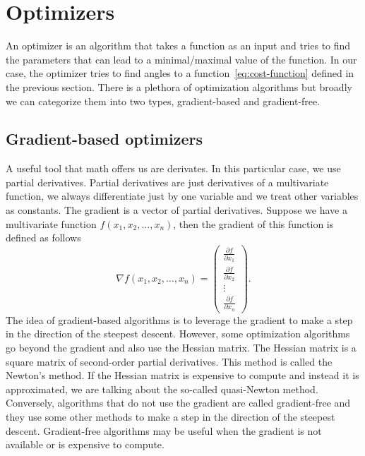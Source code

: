 \section{Optimizers}
An optimizer is an algorithm that takes a function as an input and tries to find the parameters that can lead to a minimal/maximal value of the function. In our case, the optimizer tries to find angles to a function~\ref{eq:cost-function} defined in the previous section. There is a plethora of optimization algorithms but broadly we can categorize them into two types, gradient-based and gradient-free.

\subsection{Gradient-based optimizers}
A useful tool that math offers us are derivates. In this particular case, we use partial derivatives. Partial derivatives are just derivatives of a multivariate  function, we always differentiate just by one variable and we treat other variables as constants. The gradient is a vector of partial derivatives. Suppose we have a multivariate function $f(x_1, x_2, \ldots, x_n)$, then the gradient of this function is defined as follows
$$\nabla f(x_1, x_2, \ldots, x_n) =  \begin{pmatrix} \frac{\partial f}{\partial x_1} \\ \frac{\partial f}{\partial x_2} \\ \vdots \\ \frac{\partial f}{\partial x_n}\end{pmatrix} \text{.}$$
The idea of gradient-based algorithms is to leverage the gradient to make a step in the direction of the steepest descent. However, some optimization algorithms go beyond the gradient and also use the Hessian matrix. The Hessian matrix is a square matrix of second-order partial derivatives. This method is called the Newton's method. If the Hessian matrix is expensive to compute and instead it is approximated, we are talking about the so-called quasi-Newton method. Conversely, algorithms that do not use the gradient are called gradient-free and they use some other methods to make a step in the direction of the steepest descent. Gradient-free algorithms may be useful when the gradient is not available or is expensive to compute.


